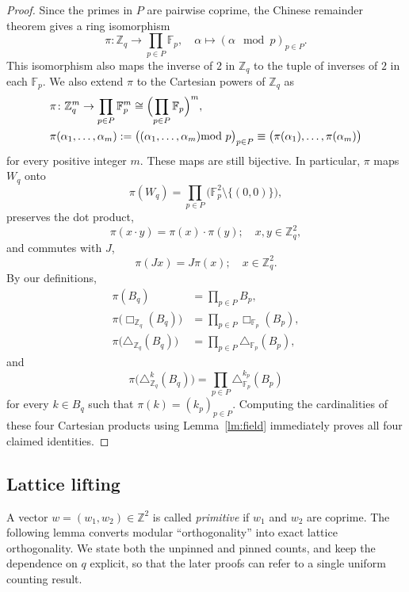 \documentclass[11pt,reqno]{amsart}
\numberwithin{equation}{section}
\begin{document}
\begin{proof}
Since the primes in $P$ are pairwise coprime, the Chinese
remainder theorem gives a ring isomorphism
\[ \pi\colon\mathbb{Z}_q\to \prod_{p\in P}\mathbb{F}_p,
\quad \alpha\mapsto (\alpha\!\!\!\!\mod p)_{p\in P}. \]
This isomorphism also maps the inverse of $2$ in $\mathbb{Z}_q$ to the tuple of inverses of $2$ in each $\mathbb{F}_p$.
We also extend $\pi$ to the Cartesian powers of $\mathbb{Z}_q$ as
\begin{align*} 
& \pi\colon\mathbb{Z}_q^m\to \prod_{p\in P}\mathbb{F}_p^m \cong \Bigl(\prod_{p\in P}\mathbb{F}_p\Bigr)^m, \\
& \pi(\alpha_1,\ldots,\alpha_m) := \bigl((\alpha_1,\ldots,\alpha_m)\!\!\!\!\mod p\bigr)_{p\in P} \equiv \big(\pi(\alpha_1),\ldots,\pi(\alpha_m)\big)
\end{align*}
for every positive integer $m$.
These maps are still bijective. In particular, $\pi$ maps $W_q$ onto
\[ \pi(W_q) = \prod_{p\in P}\bigl(\mathbb{F}_p^2\setminus\{(0,0)\}\bigr), \]
preserves the dot product,
\[ \pi(x\cdot y) = \pi(x) \cdot \pi(y); \quad x,y\in\mathbb{Z}_q^2, \]
and commutes with $J$,
\[ \pi(Jx) = J\pi(x); \quad x\in\mathbb{Z}_q^2. \]
By our definitions,
\begin{align*}
\pi(B_q) & = \prod_{p\in P} B_p, \\
\pi\bigl(\Box_{\mathbb{Z}_q}(B_q)\bigr) & = \prod_{p\in P}\Box_{\mathbb{F}_p}(B_p), \\
\pi\bigl(\triangle_{\mathbb{Z}_q}(B_q)\bigr) & = \prod_{p\in P}\triangle_{\mathbb{F}_p}(B_p),
\end{align*}
and
\[ \pi\bigl(\triangle^k_{\mathbb{Z}_q}(B_q)\bigr) = \prod_{p\in P}\triangle^{k_p}_{\mathbb{F}_p}(B_p) \]
for every $k\in B_q$ such that $\pi(k)=(k_p)_{p\in P}$.
Computing the cardinalities of these four Cartesian products using Lemma~\ref{lm:field} immediately proves all four claimed identities.
\end{proof}


\subsection{Lattice lifting}

A vector $w=(w_1,w_2)\in\mathbb{Z}^2$ is called \emph{primitive} if $w_1$ and $w_2$ are coprime. The following lemma converts modular ``orthogonality'' into exact lattice orthogonality. We state both the unpinned and pinned counts, and keep the dependence on $q$ explicit, so that the later proofs can refer to a single uniform counting result.
\end{document}
